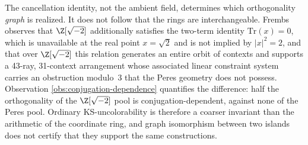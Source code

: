 %
%

The cancellation identity, not the ambient field, determines which orthogonality
\emph{graph} is realized.  It does not follow that the rings are interchangeable.
Frembs~\cite{Frembs2026} observes that $\Z[\sqrt{-2}]$ additionally satisfies the
two-term identity $\mathrm{Tr}(x) = 0$, which is unavailable at the real point
$x = \sqrt2$ and is not implied by $|x|^2 = 2$, and that over $\Z[\sqrt{-2}]$ this
relation generates an entire orbit of contexts and supports a 43-ray, 31-context
arrangement whose associated linear constraint system carries an obstruction
modulo~3 that the Peres geometry does not possess.  Observation
\ref{obs:conjugation-dependence} quantifies the difference: half the
orthogonality of the $\Z[\sqrt{-2}]$ pool is conjugation-dependent, against none
of the Peres pool.  Ordinary KS-uncolorability is therefore a coarser invariant
than the arithmetic of the coordinate ring, and graph isomorphism between two
islands does not certify that they support the same constructions.


%
%
%


